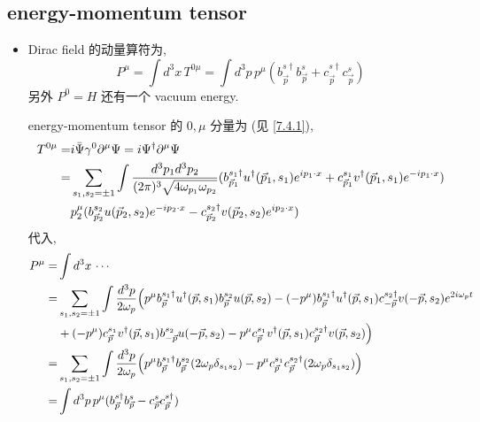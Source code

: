 \subsection{energy-momentum tensor}
\begin{itemize}
	\item Dirac field 的动量算符为,
	\begin{equation}
		P^\mu = \int d^3 x \, T^{0 \mu} = \int d^3 p \, p^\mu (b^{s \dag}_{\vec{p}} b^s_{\vec{p}} + c^{s \dag}_{\vec{p}} c^s_{\vec{p}})
	\end{equation}
	另外 $P^0 = H$ 还有一个 vacuum energy.
	
	\begin{tcolorbox}[title=calculation:]
		energy-momentum tensor 的 $0, \mu$ 分量为 (见 \eqref{7.4.1}),
		\begin{align}
			T^{0 \mu} =& i \bar{\Psi} \gamma^0 \partial^\mu \Psi = i \Psi^\dag \partial^\mu \Psi \notag \\
			=& \sum_{s_1, s_2 = \pm 1} \int \frac{d^3 p_1 d^3 p_2}{(2 \pi)^3 \sqrt{4 \omega_{p_1} \omega_{p_2}}} (b^{s_1 \dag}_{\vec{p}_1} u^\dag(\vec{p}_1, s_1) e^{i p_1 \cdot x} + c^{s_1}_{\vec{p}_1} v^\dag(\vec{p}_1, s_1) e^{- i p_1 \cdot x}) \notag \\
			& p_2^\mu (b^{s_2}_{\vec{p}_2} u(\vec{p}_2, s_2) e^{- i p_2 \cdot x} - c^{s_2 \dag}_{\vec{p}_2} v(\vec{p}_2, s_2) e^{i p_2 \cdot x})
		\end{align}
		代入,
		\begin{align}
			P^\mu =& \int d^3 x \, \cdots \notag \\
			=& \sum_{s_1, s_2 = \pm 1} \int \frac{d^3 p}{2 \omega_p} \Big( p^\mu b^{s_1 \dag}_{\vec{p}} u^\dag(\vec{p}, s_1) b^{s_2}_{\vec{p}} u(\vec{p}, s_2) - (- p^\mu) b^{s_1 \dag}_{\vec{p}} u^\dag(\vec{p}, s_1) c^{s_2 \dag}_{- \vec{p}} v(- \vec{p}, s_2) e^{2 i \omega_p t} \notag \\
			& + (- p^\mu) c^{s_1}_{\vec{p}} v^\dag(\vec{p}, s_1) b^{s_2}_{- \vec{p}} u(- \vec{p}, s_2) - p^\mu c^{s_1}_{\vec{p}} v^\dag(\vec{p}, s_1) c^{s_2 \dag}_{\vec{p}} v(\vec{p}, s_2) \Big) \notag \\
			=& \sum_{s_1, s_2 = \pm 1} \int \frac{d^3 p}{2 \omega_p} \Big( p^\mu b^{s_1 \dag}_{\vec{p}} b^{s_2}_{\vec{p}} (2 \omega_p \delta_{s_1 s_2}) - p^\mu c^{s_1}_{\vec{p}} c^{s_2 \dag}_{\vec{p}} (2 \omega_p \delta_{s_1 s_2}) \Big) \notag \\
			=& \int d^3 p \, p^\mu (b^{s \dag}_{\vec{p}} b^s_{\vec{p}} - c^s_{\vec{p}} c^{s \dag}_{\vec{p}})
		\end{align}
	\end{tcolorbox}
\end{itemize}

